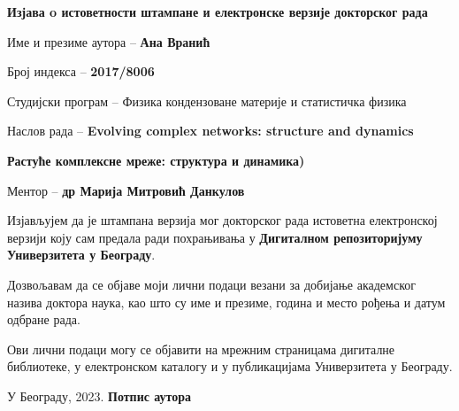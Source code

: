 \cleardoublepage

\thispagestyle{empty}
\setlength{\parindent}{0pt}
\renewcommand{\headrulewidth}{0pt}


\normalsize

\mbox{}
\vspace{1cm}

\begin{center}


\begin{Large}\textbf{Изјава o истоветности штампане и електронске верзије 
докторског рада 
}
\end{Large} 
\end{center}


\vspace{1cm}

Име и презиме аутора -- \textbf{Ана Вранић}

Број индекса -- \textbf{2017/8006}

Студијски програм --  Физика кондензоване материје и статистичка физика

Наслов рада -- 
{
\textbf{Evolving complex networks: structure and dynamics}}

\textbf{Растуће комплексне мреже: структура и динамика)}

Ментор -- \textbf{др Марија Митровић Данкулов}

Изјављујем  да  је  штампана  верзија  мог  докторског  рада  истоветна  
електронској верзији  коју  сам  предала  ради  похрањивања у \textbf{Дигиталном 
репозиторијуму Универзитета у Београду}. 

Дозвољавам да се објаве моји лични 
подаци везани за добијање академског назива доктора наука, као што су име и 
презиме, година и место рођења и датум одбране рада. 

Ови лични подаци могу се 
објавити на мрежним страницама дигиталне библиотеке, у електронском каталогу и 
у 
публикацијама Универзитета у Београду.
 

\vfill

У Београду, \hspace{1cm} 2023.  \hfill  \textbf{Потпис
аутора\hspace{2cm}\mbox{}}

\vspace{.5cm}
\hspace{10cm}\hrulefill 


\hspace{\fill}


